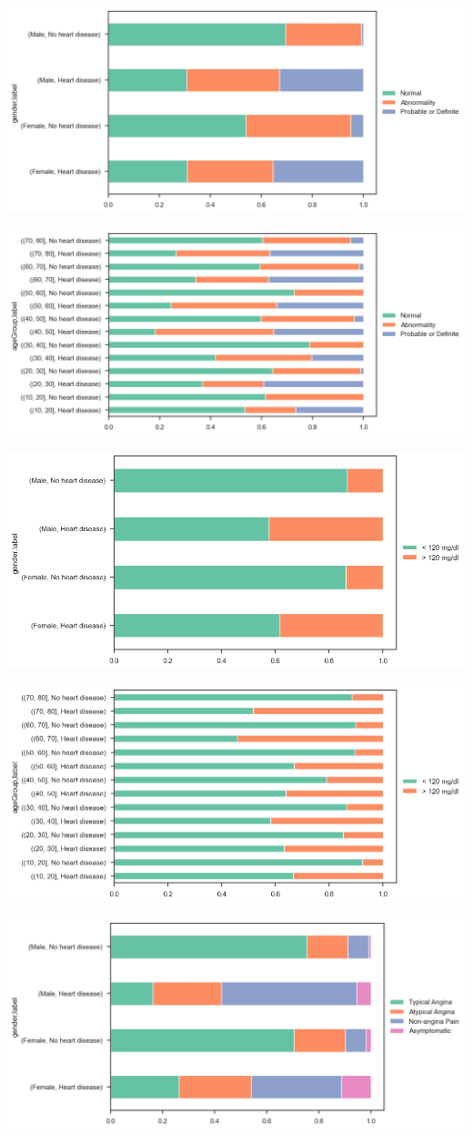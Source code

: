 \includegraphics[width=0.8\linewidth]{media/frequency-05-gender-ecg.png}

\includegraphics[width=0.8\linewidth]{media/frequency-06-agegroup-ecg.png}

\includegraphics[width=0.8\linewidth]{media/frequency-07-gender-bloodsugar.png}

\includegraphics[width=0.8\linewidth]{media/frequency-08-agegroup-bloodsugar.png}

\includegraphics[width=0.8\linewidth]{media/frequency-09-gender-paintype.png}

